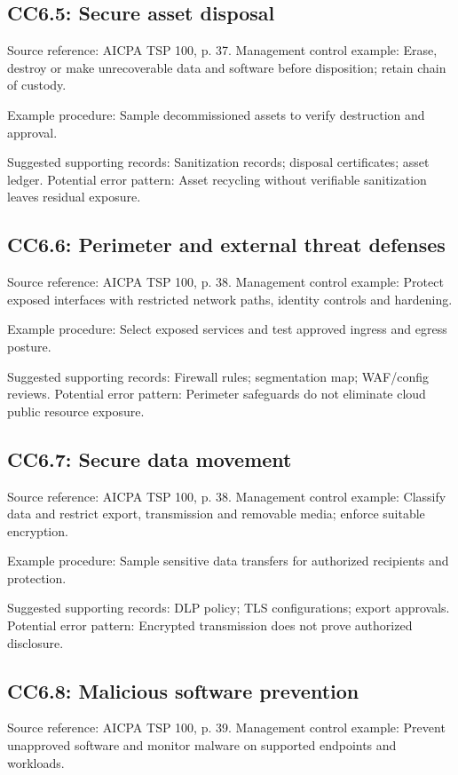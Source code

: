 \documentclass[10pt,oneside]{report}
\begin{document}
\subsection*{CC6.5: Secure asset disposal}
Source reference: AICPA TSP 100, p. 37. Management control example: Erase, destroy or make unrecoverable data and software before disposition; retain chain of custody.

Example procedure: Sample decommissioned assets to verify destruction and approval.

Suggested supporting records: Sanitization records; disposal certificates; asset ledger. Potential error pattern: Asset recycling without verifiable sanitization leaves residual exposure.

\subsection*{CC6.6: Perimeter and external threat defenses}
Source reference: AICPA TSP 100, p. 38. Management control example: Protect exposed interfaces with restricted network paths, identity controls and hardening.

Example procedure: Select exposed services and test approved ingress and egress posture.

Suggested supporting records: Firewall rules; segmentation map; WAF/config reviews. Potential error pattern: Perimeter safeguards do not eliminate cloud public resource exposure.

\subsection*{CC6.7: Secure data movement}
Source reference: AICPA TSP 100, p. 38. Management control example: Classify data and restrict export, transmission and removable media; enforce suitable encryption.

Example procedure: Sample sensitive data transfers for authorized recipients and protection.

Suggested supporting records: DLP policy; TLS configurations; export approvals. Potential error pattern: Encrypted transmission does not prove authorized disclosure.

\subsection*{CC6.8: Malicious software prevention}
Source reference: AICPA TSP 100, p. 39. Management control example: Prevent unapproved software and monitor malware on supported endpoints and workloads.
\end{document}
